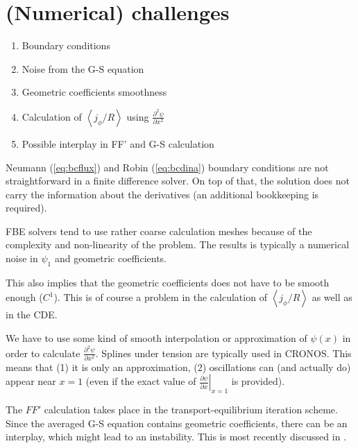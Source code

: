 \section{(Numerical) challenges}

\begin{enumerate}
\item Boundary conditions
\item Noise from the G-S equation
\item Geometric coefficients smoothness
\item Calculation of $\left\langle {{j_\phi }/R} \right\rangle$ using $\frac{{{\partial ^2}\psi }}{{\partial {x^2}}}$
\item Possible interplay in FF' and G-S calculation
\end{enumerate}

Neumann (\ref{eq:bcflux}) and Robin (\ref{eq:bcdina}) boundary conditions
are not straightforward in a finite difference solver. On top of that, the solution
does not carry the information about the derivatives (an additional bookkeeping
is required).

FBE solvers tend to use rather coarse calculation meshes because of the complexity
and non-linearity of the problem. The results is typically a numerical noise in
$\psi_1$ and geometric coefficients.

This also implies that the geometric coefficients does not have to be smooth enough ($C^1$).
This is of course a problem in the calculation of $\left\langle {{j_\phi }/R} \right\rangle$
as well as in the CDE.

We have to use some kind of smooth interpolation or approximation of $\psi\left( x \right)$ 
in order to calculate $\frac{{{\partial ^2}\psi }}{{\partial {x^2}}}$. 
Splines under tension are typically used in CRONOS. This means that (1) it is only
an approximation, (2) oscillations can (and actually do) appear near $x=1$ 
(even if the exact value of
$\left.{\frac{{\partial \psi }}{{\partial x }}} \right|_{x  = 1}$ is provided).

The $FF'$ calculation takes place in the transport-equilibrium iteration scheme. Since
the averaged G-S equation contains geometric coefficients, there can be an interplay,
which might lead to an instability. This is most recently discussed in \cite{FableScheme2013}.

